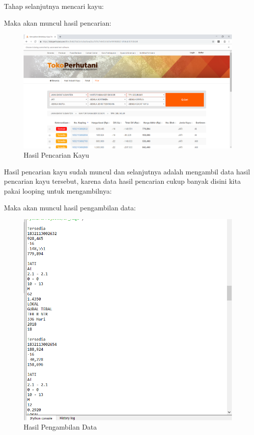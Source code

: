 Tahap selanjutnya mencari kayu:
 

\newpage
Maka akan muncul hasil pencarian:
\begin{figure}[h]
	\centering
	\includegraphics[scale=0.27]{figures/7carikayu}
	\caption{Hasil Pencarian Kayu}
\end{figure}

Hasil pencarian kayu sudah muncul dan selanjutnya adalah mengambil data hasil pencarian kayu tersebut, karena data hasil pencarian cukup banyak disini kita pakai looping untuk mengambilnya:


Maka akan muncul hasil pengambilan data:
\begin{figure}[h]
	\centering
	\includegraphics[scale=0.30]{figures/7dataambil}
	\caption{Hasil Pengambilan Data}
\end{figure}
\newpage
